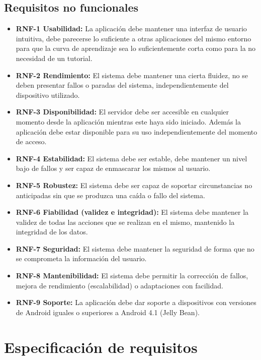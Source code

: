 \subsection{Requisitos no funcionales}

\begin{itemize}
	\item
		\textbf{RNF-1 Usabilidad:}
			La aplicación debe mantener una interfaz de usuario intuitiva, debe parecerse lo suficiente a otras aplicaciones del mismo entorno para que la curva de aprendizaje sea lo suficientemente corta como para la no necesidad de un tutorial.
	\item
		\textbf{RNF-2 Rendimiento:} 
			El sistema debe mantener una cierta fluidez, no se deben presentar fallos o paradas del sistema, independientemente del dispositivo utilizado.
	\item
		\textbf{RNF-3 Disponibilidad:} 
			El servidor debe ser accesible en cualquier momento desde la aplicación mientras este haya sido iniciado. 
			Además la aplicación debe estar disponible para su uso independientemente del momento de acceso.
	\item
		\textbf{RNF-4 Estabilidad:} 
			El sistema debe ser estable, debe mantener un nivel bajo de fallos y ser capaz de enmascarar los mismos al usuario.
	\item
		\textbf{RNF-5 Robustez:} 
			El sistema debe ser capaz de soportar circunstancias no anticipadas sin que se produzca una caída o fallo del sistema.
	\item
		\textbf{RNF-6 Fiabilidad (validez e integridad):} 
			El sistema debe mantener la validez de todas las acciones que se realizan en el mismo, mantenido la integridad de los datos.
	\item
		\textbf{RNF-7 Seguridad:} 
			El sistema debe mantener la seguridad de forma que no se comprometa la información del usuario.
	\item
		\textbf{RNF-8 Mantenibilidad:} 
			El sistema debe permitir la corrección de fallos, mejora de rendimiento (escalabilidad) o adaptaciones con facilidad.
	\item
		\textbf{RNF-9 Soporte:} 
			La aplicación debe dar soporte a dispositivos con versiones de Android iguales o superiores a Android 4.1 (Jelly Bean).
\end{itemize}



\section{Especificación de requisitos}

